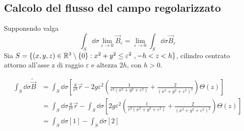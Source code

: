
\subsection{Calcolo del flusso del campo regolarizzato}
\label{sec:flusso_regolarizzato}
Supponendo valga
$$
  \int_S \dd \sigma \lim_{\varepsilon \to 0} \vec B_\varepsilon = \lim_{\varepsilon \to 0} \int_S \dd \sigma \vec B_\varepsilon
$$
Sia $S = \{(x,y,z) \in \mathbb{R}^3 \setminus \{0\} : x^2 + y^2 \leq \varepsilon ^2\ ,-h<z<h\}$,
cilindro centrato attorno all'asse z di raggio $\varepsilon$ e altezza $2h$, con $h>0$.

\begin{equation*}
   \begin{split}
      \int_S \dd \sigma \tilde{\vec B}  &= \int_S \dd \sigma \left[\frac{g}{r^3}\vec r
         - 2g\varepsilon^2 \left( \frac{1}{r^2(x^2 + y^2 + \varepsilon^2)}
               + \frac{2}{(x^2 + y^2 + \varepsilon^2)^2}\right) \Theta(z)  \right] \\
         &= \int_S \dd \sigma \frac{g}{r^3}\vec r
            - \int_S \dd \sigma \left[ 2g\varepsilon^2 \left( \frac{1}{r^2(x^2 + y^2 + \varepsilon^2)}
                  + \frac{2}{(x^2 + y^2 + \varepsilon^2)^2}\right) \Theta(z) \right] \\
          &= \int_S \dd \sigma [1] - \int_S \dd \sigma [2]
   \end{split}
\end{equation*}

